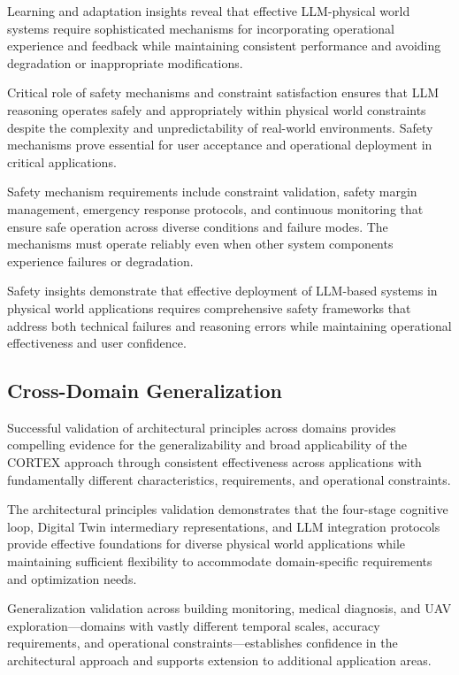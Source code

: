 Learning and adaptation insights reveal that effective LLM-physical world systems require sophisticated mechanisms for incorporating operational experience and feedback while maintaining consistent performance and avoiding degradation or inappropriate modifications.

Critical role of safety mechanisms and constraint satisfaction ensures that LLM reasoning operates safely and appropriately within physical world constraints despite the complexity and unpredictability of real-world environments. Safety mechanisms prove essential for user acceptance and operational deployment in critical applications.

Safety mechanism requirements include constraint validation, safety margin management, emergency response protocols, and continuous monitoring that ensure safe operation across diverse conditions and failure modes. The mechanisms must operate reliably even when other system components experience failures or degradation.

Safety insights demonstrate that effective deployment of LLM-based systems in physical world applications requires comprehensive safety frameworks that address both technical failures and reasoning errors while maintaining operational effectiveness and user confidence.

\subsection{Cross-Domain Generalization}

Successful validation of architectural principles across domains provides compelling evidence for the generalizability and broad applicability of the CORTEX approach through consistent effectiveness across applications with fundamentally different characteristics, requirements, and operational constraints.

The architectural principles validation demonstrates that the four-stage cognitive loop, Digital Twin intermediary representations, and LLM integration protocols provide effective foundations for diverse physical world applications while maintaining sufficient flexibility to accommodate domain-specific requirements and optimization needs.

Generalization validation across building monitoring, medical diagnosis, and UAV exploration—domains with vastly different temporal scales, accuracy requirements, and operational constraints—establishes confidence in the architectural approach and supports extension to additional application areas.

